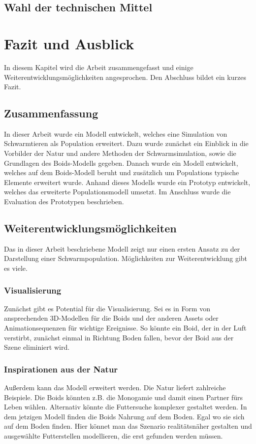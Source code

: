 \documentclass[draft=false
              ,paper=a4
              ,twoside=false
              ,fontsize=11pt
              ,headsepline
              ,BCOR10mm
              ,DIV11
              ,bibtotoc
              ,liststotoc
              ]{scrbook}
\begin{document}
\section{Wahl der technischen Mittel}

\chapter{Fazit und Ausblick}\label{fazit}
In diesem Kapitel wird die Arbeit zusammengefasst und einige Weiterentwicklungsmöglichkeiten angesprochen. Den Abschluss bildet ein kurzes Fazit.
\section{Zusammenfassung}
In dieser Arbeit wurde ein Modell entwickelt, welches eine Simulation von Schwarmtieren als Population erweitert. Dazu wurde zunächst ein Einblick in die Vorbilder der Natur und andere Methoden der Schwarmsimulation, sowie die Grundlagen des Boids-Modells gegeben. Danach wurde ein Modell entwickelt, welches auf dem Boids-Modell beruht und zusätzlich um Populations typische Elemente erweitert wurde. Anhand dieses Modells wurde ein Prototyp entwickelt, welches das erweiterte Populationsmodell umsetzt. Im Anschluss wurde die Evaluation des Prototypen beschrieben.
\section{Weiterentwicklungsmöglichkeiten}
Das in dieser Arbeit beschriebene Modell zeigt nur einen ersten Ansatz zu der Darstellung einer Schwarmpopulation. Möglichkeiten zur Weiterentwicklung gibt es viele.
\subsection{Visualisierung}
Zunächst gibt es Potential für die Visualisierung. Sei es in Form von ansprechenden 3D-Modellen für die Boids und der anderen Assets oder Animationsequenzen für wichtige Ereignisse. So könnte ein Boid, der in der Luft verstirbt, zunächst einmal in Richtung Boden fallen, bevor der Boid aus der Szene eliminiert wird.

\subsection{Inspirationen aus der Natur}
Außerdem kann das Modell erweitert werden. Die Natur liefert zahlreiche Beispiele. Die Boids könnten z.B. die Monogamie und damit einen Partner fürs Leben wählen. Alternativ könnte die Futtersuche komplexer gestaltet werden. In dem jetzigen Modell finden die Boids Nahrung auf dem Boden. Egal wo sie sich auf dem Boden finden. Hier könnet man das Szenario realitätsnäher gestalten und ausgewählte Futterstellen modellieren, die erst gefunden werden müssen.
\end{document}

